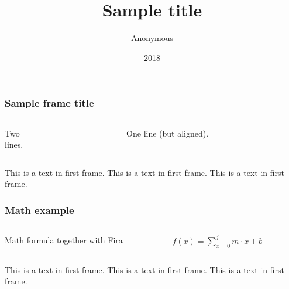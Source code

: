 \documentclass[aspectratio=169]{beamer}
\title{Sample title}
\author{Anonymous}
\institute{ShareLaTeX}
\date{2018}
\begin{document}
 
\frame{\titlepage}
 
\begin{frame}
\frametitle{Sample frame title}
\begin{columns}[t]
  \begin{column}{0.5\linewidth}
     Two\\lines.
  \end{column}
  \begin{column}{0.5\linewidth}
    One line (but aligned).
  \end{column}
\end{columns}

This is a text in first frame. This is a text in first frame. This is a text in first frame.
\end{frame}


\begin{frame}
\frametitle{Math example}
\begin{columns}[t]
  \begin{column}{0.5\linewidth}
     Math formula together with Fira
  \end{column}
  \begin{column}{0.5\linewidth}
    $f(x) = \sum_{x=0}^{j}m \cdot x + b$
  \end{column}
\end{columns}

This is a text in first frame. This is a text in first frame. This is a text in first frame.
\end{frame}
\end{document}
